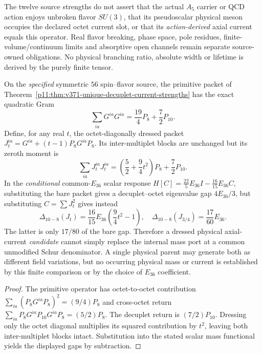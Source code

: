 \documentclass[12pt,a4paper]{article}
\begin{document}
\begin{remark}
\label{p11:rem:v371-axial-strength-scope}
The twelve source strengths do not assert that the actual $A_5$
carrier or QCD action enjoys unbroken flavor $SU(3)$, that its
pseudoscalar physical meson occupies the declared octet current
slot, or that its \emph{action-derived} axial current equals this
operator.  Real flavor breaking, phase space, pole residues,
finite-volume/continuum limits and absorptive open channels remain
separate source-owned obligations.  No physical branching ratio,
absolute width or lifetime is derived by the purely finite tensor.
\end{remark}
\begin{proposition}
\label{p11:prop:v372-internal-external-axial-gram-no-go}
On the \emph{specified} symmetric $56$ spin--flavor source, the
primitive packet of Theorem~\ref{p11:thm:v371-unique-decuplet-current-strengths}
has the exact quadratic Gram
\[
 \boxed{\sum_{ia}G^{ia}G^{ia}=\frac{19}{4}P_8+\frac72P_{10}.}
\]
Define, for any real $t$, the octet-diagonally dressed packet
$J_t^{ia}=G^{ia}+(t-1)P_8G^{ia}P_8$. Its inter-multiplet blocks are
unchanged but its zeroth moment is
\[
 \boxed{\sum_{ia}J_t^{ia}J_t^{ia}
 =\left(\frac52+\frac94t^2\right)P_8+\frac72P_{10}.}
\]
In the \emph{conditional} common-$E_{36}$ scalar response
$H[C]=\tfrac{22}{5}E_{36}I-\tfrac{16}{15}E_{36}C$,
substituting the bare packet gives a decuplet--octet eigenvalue
gap $4E_{36}/3$, but substituting $C=\sum J_t^2$ gives instead
\[
 \boxed{\Delta_{10-8}(J_t)
 =\frac{16}{15}E_{36}\left(\frac94t^2-1\right),\quad
 \Delta_{10-8}(J_{3/4})=\frac{17}{60}E_{36}.}
\]
The latter is only $17/80$ of the bare gap. Therefore a dressed
physical axial-current \emph{candidate} cannot simply replace the
internal mass port at a common unmodified Schur denominator. A single
physical parent may generate both as different field variations,
but no occurring physical mass or current is established by this
finite comparison or by the choice of $E_{36}$ coefficient.
\end{proposition}
\begin{proof}
The primitive operator has octet-to-octet contribution
$\sum_{ia}(P_8G^{ia}P_8)^2=(9/4)P_8$ and cross-octet return
$\sum_{ia}P_8G^{ia}P_{10}G^{ia}P_8=(5/2)P_8$.
The decuplet return is $(7/2)P_{10}$. Dressing only the octet
diagonal multiplies its squared contribution by $t^2$, leaving
both inter-multiplet blocks intact. Substitution into the stated
scalar mass functional yields the displayed gaps by subtraction.
\end{proof}
\end{document}
